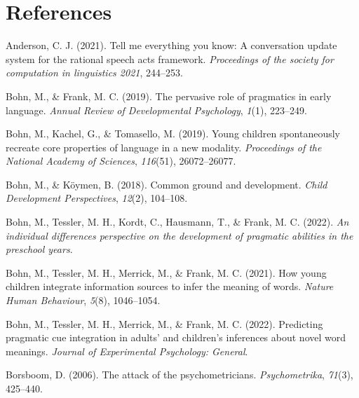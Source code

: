 \documentclass[
  man,floatsintext]{apa6}
\newlength{\cslhangindent}
\newlength{\cslentryspacingunit} %
\newenvironment{CSLReferences}[2] %
 {%
  \setlength{\parindent}{0pt}
  \ifodd #1
  \let\oldpar\par
  \def\par{\hangindent=\cslhangindent\oldpar}
  \fi
  \setlength{\parskip}{#2\cslentryspacingunit}
 }%
 {}
\begin{document}
\hypertarget{references}{%
\section{References}\label{references}}

\begingroup
\setlength{\parindent}{-0.5in}
\setlength{\leftskip}{0.5in}

\hypertarget{refs}{}
\begin{CSLReferences}{1}{0}
\leavevmode{}%
Anderson, C. J. (2021). Tell me everything you know: A conversation update system for the rational speech acts framework. \emph{Proceedings of the society for computation in linguistics 2021}, 244--253.

\leavevmode{}%
Bohn, M., \& Frank, M. C. (2019). The pervasive role of pragmatics in early language. \emph{Annual Review of Developmental Psychology}, \emph{1}(1), 223--249.

\leavevmode{}%
Bohn, M., Kachel, G., \& Tomasello, M. (2019). Young children spontaneously recreate core properties of language in a new modality. \emph{Proceedings of the National Academy of Sciences}, \emph{116}(51), 26072--26077.

\leavevmode{}%
Bohn, M., \& Köymen, B. (2018). Common ground and development. \emph{Child Development Perspectives}, \emph{12}(2), 104--108.

\leavevmode{}%
Bohn, M., Tessler, M. H., Kordt, C., Hausmann, T., \& Frank, M. C. (2022). \emph{An individual differences perspective on the development of pragmatic abilities in the preschool years}.

\leavevmode{}%
Bohn, M., Tessler, M. H., Merrick, M., \& Frank, M. C. (2021). How young children integrate information sources to infer the meaning of words. \emph{Nature Human Behaviour}, \emph{5}(8), 1046--1054.

\leavevmode{}%
Bohn, M., Tessler, M. H., Merrick, M., \& Frank, M. C. (2022). Predicting pragmatic cue integration in adults' and children's inferences about novel word meanings. \emph{Journal of Experimental Psychology: General}.

\leavevmode{}%
Borsboom, D. (2006). The attack of the psychometricians. \emph{Psychometrika}, \emph{71}(3), 425--440.


\end{CSLReferences}
\end{document}

